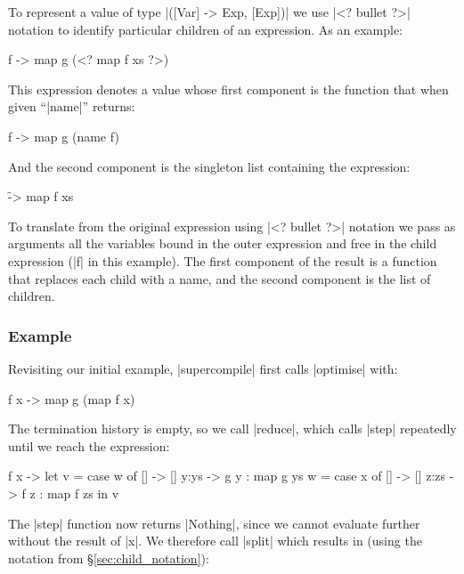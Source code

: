 \documentclass[draft]{sigplanconf}
\begin{document}
To represent a value of type |([Var] -> Exp, [Exp])| we use |<? bullet ?>| notation to identify particular children of an expression. As an example:

\begin{code}
\g f -> map g (<? map f xs ?>)
\end{code}

\noindent This expression denotes a value whose first component is the function that when given ``|name|'' returns:

\begin{code}
\g f -> map g (name f)
\end{code}

\noindent And the second component is the singleton list containing the expression:

\begin{code}
\f -> map f xs
\end{code}

To translate from the original expression using |<? bullet ?>| notation we pass as arguments all the variables bound in the outer expression and free in the child expression (|f| in this example). The first component of the result is a function that replaces each child with a name, and the second component is the list of children.

\subsubsection{Example}
\label{sec:manager_example}

Revisiting our initial example, |supercompile| first calls |optimise| with:

\begin{code}
\g f x -> map g (map f x)
\end{code}

The termination history is empty, so we call |reduce|, which calls |step| repeatedly until we reach the expression:

\begin{code}
\g f x ->  let  v = case  w of
                          []    -> []
                          y:ys  -> g y : map g ys
                w = case  x of
                          []    -> []
                          z:zs  -> f z : map f zs
           in   v
\end{code}

The |step| function now returns |Nothing|, since we cannot evaluate further without the result of |x|. We therefore call |split| which results in (using the notation from \S\ref{sec:child_notation}):
\end{document}
